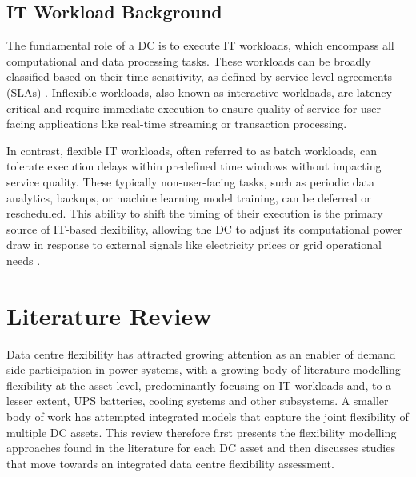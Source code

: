 \documentclass[lettersize,journal]{IEEEtran}
\newcommand{\rev}[1]{#1}
\begin{document}
\subsection{IT Workload Background}
The fundamental role of a DC is to execute IT workloads, which encompass all computational and data processing tasks. These workloads can be broadly classified based on their time sensitivity, as defined by service level agreements (SLAs) \cite{Liu2024Access,Cao2022ApEn}. Inflexible workloads, also known as interactive workloads, are latency-critical and require immediate execution to ensure quality of service for user-facing applications like real-time streaming or transaction processing.

In contrast, flexible IT workloads, often referred to as batch workloads, can tolerate execution delays within predefined time windows without impacting service quality. These typically non-user-facing tasks, such as periodic data analytics, backups, or machine learning model training, can be deferred or rescheduled. This ability to shift the timing of their execution is the primary source of IT-based flexibility, allowing the DC to adjust its computational power draw in response to external signals like electricity prices or grid operational needs \cite{Cao2022ApEn}.

\section{Literature Review}\label{sec:literature}

\rev{Data centre flexibility has attracted growing attention as an enabler of demand side participation in power systems, with a growing body of literature modelling flexibility at the asset level, predominantly focusing on IT workloads and, to a lesser extent, UPS batteries, cooling systems and other subsystems. A smaller body of work has attempted integrated models that capture the joint flexibility of multiple DC assets. This review therefore first presents the flexibility modelling approaches found in the literature for each DC asset and then discusses studies that move towards an integrated data centre flexibility assessment.}
\end{document}
